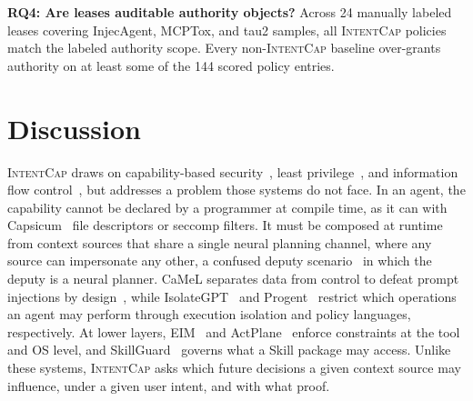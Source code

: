 \documentclass[sigconf,nonacm]{acmart}
\newcommand{\sys}{\textsc{IntentCap}\xspace}
\begin{document}
\textbf{RQ4: Are leases auditable authority objects?}
Across 24 manually labeled leases covering InjecAgent, MCPTox, and tau2 samples, all \sys policies match the labeled authority scope.
Every non-\sys baseline over-grants authority on at least some of the 144 scored policy entries.

\section{Discussion}

\sys draws on capability-based security~\cite{dennis-vanhorn}, least privilege~\cite{saltzer-schroeder}, and information flow control~\cite{denning-lattice}, but addresses a problem those systems do not face.
In an agent, the capability cannot be declared by a programmer at compile time, as it can with Capsicum~\cite{capsicum} file descriptors or seccomp filters.
It must be composed at runtime from context sources that share a single neural planning channel, where any source can impersonate any other, a confused deputy scenario~\cite{confused-deputy} in which the deputy is a neural planner.
CaMeL separates data from control to defeat prompt injections by design~\cite{camel}, while IsolateGPT~\cite{isolategpt} and Progent~\cite{progent} restrict which operations an agent may perform through execution isolation and policy languages, respectively.
At lower layers, EIM~\cite{eim-bpftime} and ActPlane~\cite{actplane} enforce constraints at the tool and OS level, and SkillGuard~\cite{skillguard} governs what a Skill package may access.
Unlike these systems, \sys asks which future decisions a given context source may influence, under a given user intent, and with what proof.




\end{document}
